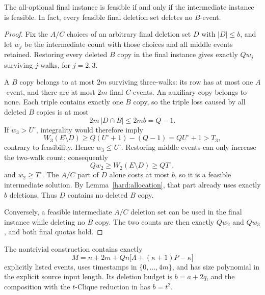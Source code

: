 \begin{lemma}
\label{hard:replication}
The all-optional final instance is feasible if and only if the
intermediate instance is feasible. In fact, every feasible final deletion
set deletes no \(B\)-event.
\end{lemma}

\begin{proof}
Fix the \(A/C\) choices of an arbitrary final deletion set \(D\) with
\(|D|\le b\), and let \(w_j\) be the intermediate count with those
choices and all middle events retained. Restoring every deleted \(B\)
copy in the final instance gives exactly \(Qw_j\) surviving \(j\)-walks,
for \(j=2,3\).

A \(B\) copy belongs to at most \(2m\) surviving three-walks: its row has
at most one \(A\)-event, and there are at most \(2m\) final \(C\)-events.
An auxiliary copy belongs to none. Each triple contains exactly one
\(B\) copy, so the triple loss caused by all deleted \(B\) copies is at
most
\[
 2m\,|D\cap B|\le2mb=Q-1.
\]
If \(w_3>U^\circ\), integrality would therefore imply
\[
 W_3(E\setminus D)\ge Q(U^\circ+1)-(Q-1)=QU^\circ+1>T_3,
\]
contrary to feasibility. Hence \(w_3\le U^\circ\).
Restoring middle events can only increase the two-walk count; consequently
\[
 Qw_2\ge W_2(E\setminus D)\ge QT^\circ,
\]
and \(w_2\ge T^\circ\).
The \(A/C\) part of \(D\) alone costs at most \(b\), so it is a feasible
intermediate solution. By Lemma~\ref{hard:allocation}, that part already
uses exactly \(b\) deletions. Thus \(D\) contains no deleted \(B\) copy.

Conversely, a feasible intermediate \(A/C\) deletion set can be used in
the final instance while deleting no \(B\) copy. The two counts are then
exactly \(Qw_2\) and \(Qw_3\), and both final quotas hold.
\end{proof}

\begin{lemma}
\label{hard:size}
The nontrivial construction contains exactly
\begin{equation}
\label{hard:event-count}
 M=n+2m+Qn\bigl[\Lambda+(\kappa+1)P-\kappa\bigr]
\end{equation}
explicitly listed events, uses timestamps in \(\{0,\ldots,4m\}\), and
has size polynomial in the explicit source input length.
Its deletion budget is \(b=a+2q\), and the composition with the
\(t\)-Clique reduction in \cite[Theorem~10]{mkrtchyan2024} has \(b=t^2\).
\end{lemma}

